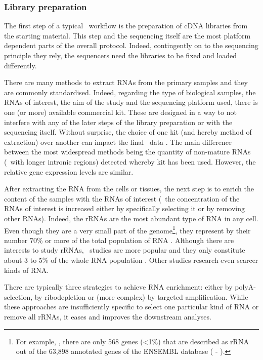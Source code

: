 \subsubsection{Library preparation}

The first step of a typical \Rnaseq\ workflow is the preparation of \gls{cDNA}
libraries from the starting material. This step and the sequencing itself are
the most platform dependent parts of the overall protocol. Indeed, contingently
on to the sequencing principle they rely, the sequencers need the libraries to
be fixed and loaded differently.

There are many methods to extract \glspl{RNA} from the primary samples and they
are commonly standardised. Indeed, regarding the type of biological samples,
the \glspl{RNA} of interest, the aim of the  study and the sequencing platform
used, there is one (or more) available commercial kit. These are designed in
a way to not interfere
with any of the later steps of the library preparation or with the sequencing
itself.
Without surprise, the choice of one kit (and hereby method of extraction)
over another can impact the final \Rnaseq\ data . The main
difference between the most widespread methods being the quantity of non-mature
\glspl{RNA} (\ie\ with longer intronic regions) detected whereby kit
has been used. However, the relative gene expression levels are similar.



After extracting the \gls{RNA} from the cells or tissues,
the next step is to enrich the content of the samples with the \glspl{RNA}
of interest (\ie\ the concentration of the \glspl{RNA} of interest is increased
either by specifically selecting it or by removing other \glspl{RNA}). Indeed,
the \glspl{rRNA} are the most abundant type of \gls{RNA} in any cell. Even
though they are a very small part of the genome\footnote{For example,
, there are only 568 genes (<1\%) that are described as
\gls{rRNA} out of the 63,898 annotated genes of the ENSEMBL database
( - ).}, they represent by their number 70\% or more of
the total population of \gls{RNA} .
Although there are interests to study \glspl{rRNA}, \mRNAs\ studies are more
popular and they only constitute about 3 to 5\% of the whole \gls{RNA} population
. Other studies research even scarcer kinds of \gls{RNA}.

There are typically three strategies to achieve \gls{RNA} enrichment:
either by polyA-selection, by ribodepletion or (more complex)
by targeted amplification. While these
approaches are insufficiently specific to select one particular kind of \gls{RNA}
or remove all \glspl{rRNA}, it eases and improves the downstream analyses.

